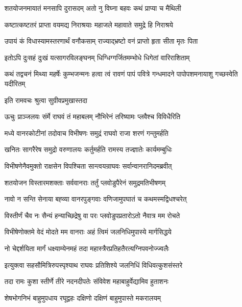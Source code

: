 \twolineshloka
{शतयोजनमायातं मनसापि दुरासदम्}
{अतो नु विघ्ना बहवः कथं प्राप्या च मैथिली}%

\twolineshloka
{कष्टात्कष्टतरं प्राप्ता वयमद्य निराश्रयाः}
{महाजले महावाते समुद्रे हि निराश्रये}%

\twolineshloka
{उपायं कं विधास्यामस्तरणार्थं वनौकसाम्}
{राज्याद्भ्रष्टो वनं प्राप्तो हृता सीता मृतः पिता}%

\twolineshloka
{इतोऽपि दुःसहं दुःखं यत्सागरविलङ्घनम्}
{धिग्धिग्गर्जितमम्भोधे धिगेतां वारिराशिताम्}%

\threelineshloka
{कथं तद्वचनं मिथ्या महर्षेः कुम्भजन्मनः}
{हत्वा त्वं रावणं पापं पवित्रे गन्धमादने}
{पापोपशमनायाशु गच्छस्वेति यदीरितम्}%


\onelineshloka
{इति रामवचः श्रुत्वा सुग्रीवप्रमुखास्तदा}%

\twolineshloka
{ऊचुः प्राञ्जलयः संर्मे राघवं तं महाबलम्}
{नौभिरेनं तरिष्यामः प्लवैश्च विविधैरिति}%

\twolineshloka
{मध्ये वानरकोटीनां तदोवाच विभीषणः}
{समुद्रं राघवो राजा शरणं गन्तुमर्हति}%

\twolineshloka
{खनितः सागरैरेष समुद्रो वरुणालयः}
{कर्तुमर्हति रामस्य तज्ज्ञातेः कार्यमम्बुधिः}%

\twolineshloka
{विभीषणेनैवमुक्तो राक्षसेन विपश्चिता}
{सान्त्वयन्राघवः सर्वान्वानरानिदमब्रवीत्}%

\twolineshloka
{शतयोजन विस्तारमशक्ताः सर्ववानराः}
{तर्तुं प्लवोडुपैरेनं समुद्रमतिभीषणम्}%

\twolineshloka
{नावो न सन्ति सेनाया बह्व्या वानरपुङ्गवाः}
{वणिजामुपघातं च कथमस्मद्विधश्चरेत्}%

\twolineshloka
{विस्तीर्णं चैव नः सैन्यं हन्याच्छिद्रेषु वा परः}
{प्लवोडुपप्रतारोऽतो नैवात्र मम रोचते}%

\twolineshloka
{विभीषेणोक्तमे वेदं मोदते मम वानराः}
{अहं त्विमं जलनिधिमुपास्ये मार्गसिद्धये}%

\twolineshloka
{नो चेद्दर्शयिता मार्गं धक्ष्याम्येनमहं तदा}
{महास्त्रैरप्रतिहतैरत्यग्निपवनोज्ज्वलैः}%

\twolineshloka
{इत्युक्त्वा सहसौमित्रिरुपस्पृश्याथ राघवः}
{प्रतिशिश्ये जलनिधिं विधिवत्कुशसंस्तरे}%

\twolineshloka
{तदा रामः कुशा स्तीर्णे तीरे नदनदीपतेः}
{संविवेश महाबाहुर्वेद्यामिव हुताशनः}%

\twolineshloka
{शेषभोगनिभं बाहुमुपधाय रघूद्वहः}
{दक्षिणो दक्षिणं बाहुमुपास्ते मकरालयम्}%

